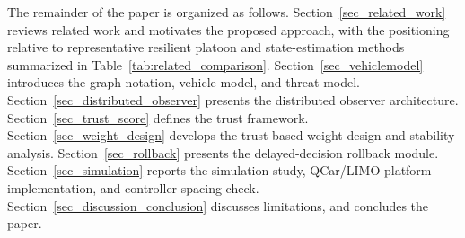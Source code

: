 \documentclass[letterpaper,journal]{IEEEtran}
\begin{document}
The remainder of the paper is organized as follows. Section~\ref{sec_related_work} reviews related work and motivates the proposed approach, with the positioning relative to representative resilient platoon and state-estimation methods summarized in Table~\ref{tab:related_comparison}. Section~\ref{sec_vehiclemodel} introduces the graph notation, vehicle model, and threat model. Section~\ref{sec_distributed_observer} presents the distributed observer architecture. Section~\ref{sec_trust_score} defines the trust framework. Section~\ref{sec_weight_design} develops the trust-based weight design and stability analysis. Section~\ref{sec_rollback} presents the delayed-decision rollback module. Section~\ref{sec_simulation} reports the simulation study, QCar/LIMO platform implementation, and controller spacing check. Section~\ref{sec_discussion_conclusion} discusses limitations, and concludes the paper.
\end{document}
